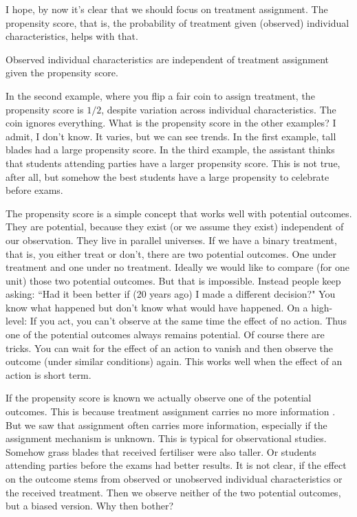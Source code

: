 I hope, by now it's clear that 
we should focus on treatment assignment.
The propensity score\cite{Rosenbaum1983}, that is,
the probability of treatment given (observed) individual characteristics,
helps with that.
\begin{theorem*}
  \emph{\cite[Theorem~1]{Rosenbaum1983}}
Observed individual characteristics are independent 
of treatment assignment given the propensity score.
\end{theorem*}



In the second example, where you flip a fair coin to assign treatment, the propensity score is $1/2$, despite variation across individual characteristics.
The coin ignores everything.
What is the propensity score in the other examples?
I admit, I don't know.
It varies, but we can see trends. 
In the first example, tall blades had a large propensity score.
In the third example, the assistant thinks that students attending parties have a larger propensity score. This is not true, after all, but somehow the best students have a large propensity to celebrate before exams. 

The propensity score is a simple concept that works well with potential outcomes.
They are potential, because they exist (or we assume they exist) independent of our observation. They live in parallel universes.
If we have a binary treatment, that is, you either treat or don't, there are two potential outcomes. One under treatment and one under no treatment.
Ideally we would like to compare (for one unit) those two potential outcomes.
But that is impossible. 
Instead people keep asking:
“Had it been better if (20 years ago) I made a different decision?"
You know what happened but don't know what would have happened.
On a high-level: If you act, you can't observe at the same time the effect of no action.
Thus one of the potential outcomes always remains potential.
Of course there are tricks. You can  wait for the effect of an action to vanish and then observe the outcome (under similar conditions) again.
This works well when the effect of an action is short term.

If the propensity score is known we actually observe one of the potential outcomes.
This is because treatment assignment carries no more information \emph{\cite[Theorem~1]{Rosenbaum1983}}.
But we saw that assignment often carries more information, especially if the assignment mechanism is unknown.
This is typical for observational studies.
Somehow grass blades that received fertiliser were also taller.
Or students attending parties before the exams had better results.
It is not clear, if the effect on the outcome stems from observed or unobserved individual characteristics or the received treatment.
Then we observe neither of the two potential outcomes, but a biased version.
Why then bother?

